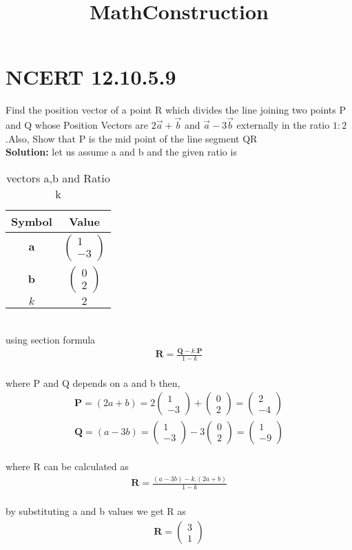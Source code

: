 \documentclass{article}
\title{MathConstruction}
\newcommand{\myvec}[1]{\ensuremath{\begin{pmatrix}#1\end{pmatrix}}}
\let\vec\mathbf
\begin{document}
\section{NCERT 12.10.5.9}

Find the position vector of a point R which divides the line joining two points P and Q whose Position Vectors are $2\overrightarrow{a}+\overrightarrow{b}$ and $\overrightarrow{a}-3\overrightarrow{b}$ externally in the ratio $1:2$.Also, Show that P is the mid point of the line segment QR  \\
\textbf{Solution:}
let us assume a and b and the given ratio is
\begin{table}[h]
    \centering
    \begin{tabular}{|c|c|}
        \hline
        \textbf{Symbol} & \textbf{Value} \\
        \hline
        $\vec{a}$ & $\myvec{1\\-3}$ \\
        \hline
        $\vec{b}$ & $\myvec{0\\2}$ \\
        \hline
        $k$ & $2$ \\
        \hline
    \end{tabular}
    \label{tab:mytable}
    \caption{vectors a,b and Ratio k}
\end{table}\\
using section formula
\begin{align}
    \vec{R}=\frac{\vec{Q}-k.\vec{P}}{1-k}
\end{align}\\
where P and Q depends on a and b then,
\begin{align}
    \vec{P}=(2a+b)=2\myvec{1\\-3}+\myvec{0\\2}=\myvec{2\\-4}\\
    \vec{Q}=(a-3b)=\myvec{1\\-3}-3\myvec{0\\2}=\myvec{1\\-9}
\end{align}\\
where R can be calculated as 
\begin{align}
    \vec{R}=\frac{(a-3b)-k.(2a+b)}{1-k}
\end{align}\\
by substituting a and b values we get R as
\begin{align}
    \vec{R}=\myvec{3\\1}
\end{align}
\end{document}
